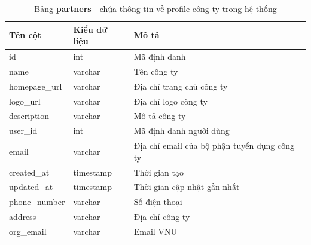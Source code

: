 \documentclass[./../main.tex]{subfiles}
\begin{document}
\begin{table}[H]
	\caption[Bảng partners]{Bảng \textbf{partners} - chứa thông tin về profile công ty trong hệ thống}
	\label{tab:db_partners}
	\begin{tabularx}{\textwidth}{|l|l|X|}
	\hline
	\textbf{Tên cột} & \textbf{Kiểu dữ liệu} & \textbf{Mô tả}                               \\ \hline
	id               & int                   & Mã định danh                                 \\ \hline
	name             & varchar               & Tên công ty                                  \\ \hline
	homepage\_url    & varchar               & Địa chỉ trang chủ công ty                    \\ \hline
	logo\_url        & varchar               & Địa chỉ logo công ty                         \\ \hline
	description      & varchar               & Mô tả công ty                                \\ \hline
	user\_id         & int                   & Mã định danh người dùng                      \\ \hline
	email            & varchar               & Địa chỉ email của bộ phận tuyển dụng công ty \\ \hline
	created\_at      & timestamp             & Thời gian tạo                                \\ \hline
	updated\_at      & timestamp             & Thời gian cập nhật gần nhất                  \\ \hline
	phone\_number    & varchar               & Số điện thoại                                \\ \hline
	address          & varchar               & Địa chỉ công ty                              \\ \hline
	org\_email       & varchar               & Email VNU                                    \\ \hline
	\end{tabularx}
\end{table}
\end{document}
